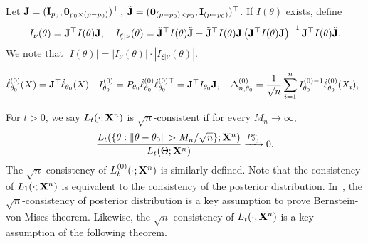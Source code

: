 \documentclass[11pt]{article}
\theoremstyle{plain}
\theoremstyle{definition}
\theoremstyle{remark}
\begin{document}
Let
$\mathbf{J}=(\mathbf{I}_{p_0},\mathbf{0}_{p_0\times(p-p_0)})^\top $,
$\tilde{\mathbf{J}}=(\mathbf {0}_{ (p- p_0) \times p_0 },\mathbf{I}_{(p-p_0)})^\top $.
If $I(\theta)$ exists, define
\begin{align*}
    I_{\nu}(\theta)=\mathbf{J}^\top I(\theta) \mathbf{J},
    \quad
    I_{\xi|\nu}(\theta) = 
    \tilde {\mathbf{J}} ^\top  I(\theta) \tilde {\mathbf{J}}
    -
    \tilde {\mathbf{J}} ^\top  I(\theta) \mathbf{J}
    \left(  \mathbf{J} ^\top  I(\theta) \mathbf{J} \right)^{-1}
    \mathbf{J} ^\top  I(\theta) \tilde {\mathbf{J}}
    .
\end{align*}
We note that $|I(\theta)| = |I_{\nu}(\theta)|\cdot |I_{\xi | \nu}(\theta )|$.

$$
\dot{\ell}_{\theta_0}^{(0)}(X)= \mathbf{J}^\top \dot \ell_{\theta_0}(X)
\quad 
I^{(0)}_{\theta_0}=P_{\theta_0}\dot{\ell}_{\theta_0}^{(0)}\dot{\ell}_{\theta_0}^{(0)\top}=\mathbf{J}^\top I_{\theta_0} \mathbf{J},\quad 
\Delta_{n,\theta_0}^{(0)}
=\frac{1}{\sqrt{n}}\sum_{i=1}^n I_{\theta_0}^{(0)-1}\dot{\ell}^{(0)}_{\theta_0}(X_i),
.
$$


For $t>0$, we say $L_t(\cdot;\mathbf{X}^{n})$ is $\sqrt{n}$-consistent if for every $M_n\to \infty$,
    $$
    \frac{L_t({\{\theta:\|\theta-\theta_0\|> M_n/\sqrt{n}\}};\BX^{n})}{L_t(\Theta;\BX^{n})}\xrightarrow{P_{\theta_0}^n} 0.
    $$
    The $\sqrt{n}$-consistency of $L_t^{(0)}(\cdot;\mathbf{X}^{n})$ is similarly defined.
    Note that the consistency of $L_1(\cdot;\mathbf{X}^{n})$ is equivalent to the consistency of the posterior distribution.
    In~\cite{Kleijn2012The}, the $\sqrt{n}$-consistency of posterior distribution is a key assumption to prove Bernstein-von Mises theorem.
    Likewise, the $\sqrt{n}$-consistency of $L_t(\cdot;\mathbf{X}^{n})$ is a key assumption of the following theorem.
\end{document}
